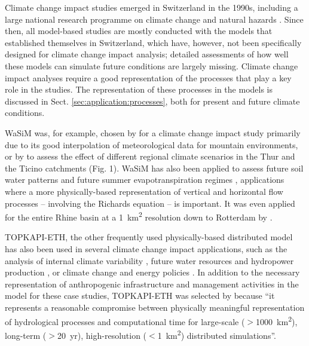 \documentclass[10pt,a4paper]{article}
\begin{document}
Climate change impact studies emerged in Switzerland in the 1990s, including a large national research programme on climate change and natural hazards \citep{snfs}. Since then, all model-based studies are mostly conducted with the models that established themselves in Switzerland, which have, however, not been specifically designed for climate change impact analysis; detailed assessments of how well these models can simulate future conditions are largely missing. Climate change impact analyses require a good representation of the processes that play a key role in the studies. The representation of these processes in the models is discussed in Sect. \ref{sec:application:processes}, both for present and future climate conditions.

WaSiM was, for example, chosen by \citet{Middelkoop2001} for a climate change impact study primarily due to its good interpolation of meteorological data for mountain environments, or by \citet{Jasper2004} to assess the effect of different regional climate scenarios in the Thur and the Ticino catchments (Fig. 1). WaSiM has also been applied to assess future soil water patterns \citep{Jasper2006, Rossler2012} and future summer evapotranspiration regimes \citep{Calanca2006}, applications where a more physically-based representation of vertical and horizontal flow processes -- involving the Richards equation -- is important. It was even applied for the entire Rhine basin at a 1~km\textsuperscript{2} resolution down to Rotterdam by \citet{Kleinn2005}.

TOPKAPI-ETH, the other frequently used physically-based distributed model has also been used in several climate change impact applications, such as the analysis of internal climate variability \citep{Fatichi2014}, future water resources and hydropower production  \citep{Finger2012, Fatichi2015}, or climate change and energy policies
\citep{Anghileri2018}. In addition to the necessary representation of anthropogenic infrastructure and management activities in the model for these case studies, TOPKAPI-ETH was selected by \citet{Fatichi2015} because “it represents a reasonable compromise between physically meaningful representation of hydrological processes and computational time for large-scale ($>$1000~km\textsuperscript{2}), long-term ($>$20~yr), high-resolution ($<$1~km\textsuperscript{2}) distributed simulations”.
\end{document}
